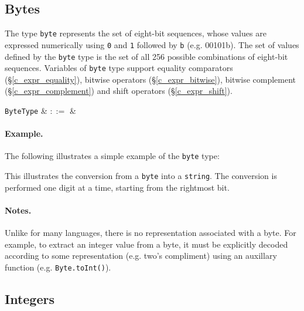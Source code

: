 
\subsection{Bytes}
\label{c_types_byte}

The type \lstinline{byte} represents the set of eight-bit sequences, whose values are expressed numerically using \lstinline{0} and \lstinline{1} followed by \lstinline{b} (e.g. 00101b).  The set of values defined by the \lstinline{byte} type is the set of all 256 possible combinations of eight-bit sequences.   Variables of \lstinline{byte} type support equality comparators (\S\ref{c_expr_equality}), bitwise operators (\S\ref{c_expr_bitwise}), bitwise complement (\S\ref{c_expr_complement}) and shift operators (\S\ref{c_expr_shift}).

\begin{syntax}
 \verb+ByteType+ & $::=$ & \\
\end{syntax}

\paragraph{Example.} The following illustrates a simple example of the \lstinline{byte} type:



This illustrates the conversion from a \lstinline{byte} into a \lstinline{string}.  The conversion is performed one digit at a time, starting from the rightmost bit.

\paragraph{Notes.}  Unlike for many languages, there is no representation associated with a byte. For example, to extract an integer value from a byte, it must be explicitly decoded according to some representation (e.g. two's compliment) using an auxillary function (e.g. \lstinline{Byte.toInt()}).



\subsection{Integers}
\label{c_types_int}


